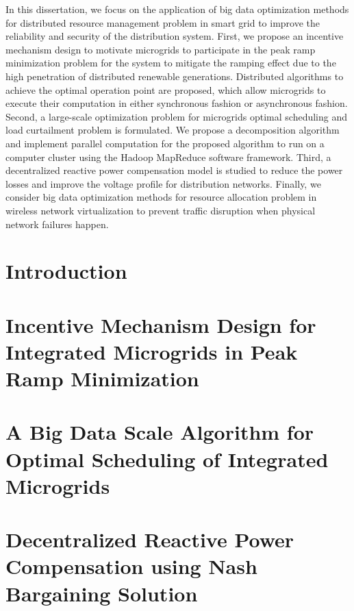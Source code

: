 \documentclass[11pt,ECE_Dissertation_Style]{report}
\numberwithin{algorithm}{chapter}
\begin{document}
In this dissertation, we focus on the application of big data optimization methods for distributed resource management problem in smart grid to improve the reliability and security of the distribution system. First, we propose an incentive mechanism design to motivate microgrids to participate in the peak ramp minimization problem for the system to mitigate the ramping effect due to the high penetration of distributed renewable generations. Distributed algorithms to achieve the optimal operation point are proposed, which allow microgrids to execute their computation in either synchronous fashion or asynchronous fashion. Second, a large-scale optimization problem for microgrids optimal scheduling and load curtailment problem is formulated. We propose a decomposition algorithm and implement parallel computation for the proposed algorithm to run on a computer cluster using the Hadoop MapReduce software framework. Third, a decentralized reactive power compensation model is studied to reduce the power losses and improve the voltage profile for distribution networks. Finally, we consider big data optimization methods for resource allocation problem in wireless network virtualization to prevent traffic disruption when physical network failures happen. 




\newpage
\makecontentspages

\prefacesection


 \chapter{Introduction}
 \label{chap:Intro}
 
 
 \chapter{Incentive Mechanism Design for Integrated Microgrids in Peak Ramp Minimization}
 \label{chap:PeakRamp}
 
 
 
 \chapter{A Big Data Scale Algorithm for Optimal Scheduling of Integrated Microgrids}
 \label{chap:Bigdata}
 
 
 \chapter{Decentralized Reactive Power Compensation using Nash Bargaining Solution}
 \label{chap:reactivepower}
 
 
\end{document}
